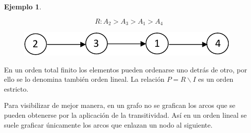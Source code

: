 \documentclass[a5paper,doc,10pt,noapacite]{apa6}
\newtheorem{ejem}{Ejemplo}
\begin{document}
{{\begin{ejem}
\begin{table}[H]
\begin{floatrow}
	\fontsize{7}{11}\selectfont
	\captionsetup{justification=centering, labelfont=footnotesize, font=footnotesize}
\end{floatrow}
\end{table}

\[
	R: A_2 > A_3 > A_1 > A_4
\]

\begin{figure}[H]
    \centering
    \includegraphics[scale=0.9]{Graficos/fig2_RB}
    \label{fig:RB_grafo2}
\end{figure}

\end{ejem}

En un orden total finito los elementos pueden ordenarse uno detrás de otro, por ello se lo denomina también orden lineal. La relación \(P = R \backslash I\) es un orden estricto.

Para visibilizar de mejor manera, en un grafo no se grafican los arcos que se pueden obtenerse por la aplicación de la transitividad. Así en un orden lineal se suele graficar únicamente los arcos que enlazan un nodo al siguiente.

}}
\end{document}
